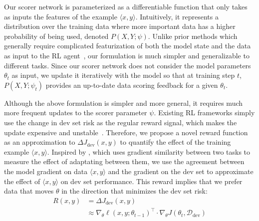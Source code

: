 Our scorer network is parameterized as a differentiable function that only takes as inputs the features of the example $\langle x, y \rangle$. Intuitively, it represents a distribution over the training data where more important data has a higher probability of being used, denoted $P(X, Y; \psi)$. Unlike prior methods which generally require complicated featurization of both the model state and the data as input to the RL agent~\citep{learn_to_teach,mentornet,learn_active_learn}, our formulation is much simpler and  generalizable to different tasks. Since our scorer network does not consider the model parameters $\theta_t$ as input, we update it iteratively with the model so that at training step $t$, $P(X, Y; \psi_t)$ provides an up-to-date data scoring feedback for a given $\theta_t$. %

Although the above formulation is simpler and more general, it requires much more frequent updates to the scorer parameter $\psi$. Existing RL frameworks simply use the change in dev set risk as the regular reward signal, which makes the update expensive and unstable~\citep{learn_to_teach,rl_nmt}. Therefore, we propose a novel reward function as an approximation to $\Delta J_{\text{dev}}(x, y)$ to quantify the effect of the training example $\langle x, y \rangle$. Inspired by \citet{cos_sim}, which uses gradient similarity between two tasks to measure the effect of adaptating between them, we use the agreement between the model gradient on data $\langle x, y \rangle$ and the gradient on the dev set to approximate the effect of $\langle x, y \rangle$ on dev set performance. This reward implies that we prefer data that moves $\theta$ in the direction that minimizes the dev set risk: 
\begin{equation}
    \label{eqn:reward_fn}
\begin{aligned}
     R(x, y) & = \Delta J_{\text{dev}}(x, y) \\
    & \approx \nabla_\theta \ell(x, y; \theta_{t-1})^\top \cdot \nabla_\theta J(\theta_t, \mathcal{D}_\text{dev}) 
\end{aligned}
\end{equation}

